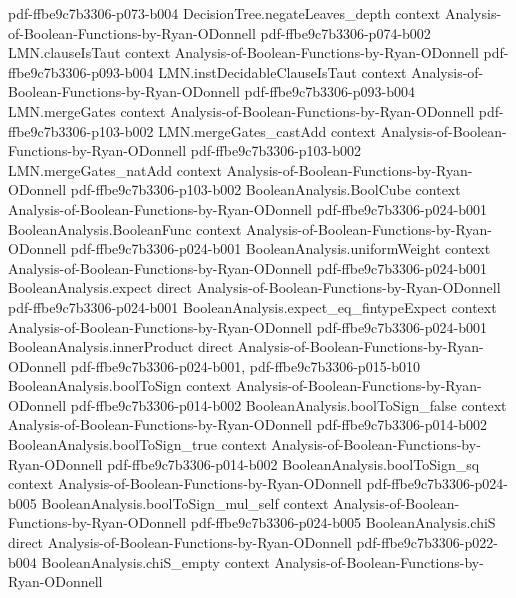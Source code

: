 \begin{theorem}
  {pdf-ffbe9c7b3306-p073-b004}
\proofstep
  {DecisionTree.negateLeaves_depth}
  {context}
  {Analysis-of-Boolean-Functions-by-Ryan-ODonnell}
  {pdf-ffbe9c7b3306-p074-b002}
\proofstep
  {LMN.clauseIsTaut}
  {context}
  {Analysis-of-Boolean-Functions-by-Ryan-ODonnell}
  {pdf-ffbe9c7b3306-p093-b004}
\proofstep
  {LMN.instDecidableClauseIsTaut}
  {context}
  {Analysis-of-Boolean-Functions-by-Ryan-ODonnell}
  {pdf-ffbe9c7b3306-p093-b004}
\proofstep
  {LMN.mergeGates}
  {context}
  {Analysis-of-Boolean-Functions-by-Ryan-ODonnell}
  {pdf-ffbe9c7b3306-p103-b002}
\proofstep
  {LMN.mergeGates_castAdd}
  {context}
  {Analysis-of-Boolean-Functions-by-Ryan-ODonnell}
  {pdf-ffbe9c7b3306-p103-b002}
\proofstep
  {LMN.mergeGates_natAdd}
  {context}
  {Analysis-of-Boolean-Functions-by-Ryan-ODonnell}
  {pdf-ffbe9c7b3306-p103-b002}
\proofstep
  {BooleanAnalysis.BoolCube}
  {context}
  {Analysis-of-Boolean-Functions-by-Ryan-ODonnell}
  {pdf-ffbe9c7b3306-p024-b001}
\proofstep
  {BooleanAnalysis.BooleanFunc}
  {context}
  {Analysis-of-Boolean-Functions-by-Ryan-ODonnell}
  {pdf-ffbe9c7b3306-p024-b001}
\proofstep
  {BooleanAnalysis.uniformWeight}
  {context}
  {Analysis-of-Boolean-Functions-by-Ryan-ODonnell}
  {pdf-ffbe9c7b3306-p024-b001}
\proofstep
  {BooleanAnalysis.expect}
  {direct}
  {Analysis-of-Boolean-Functions-by-Ryan-ODonnell}
  {pdf-ffbe9c7b3306-p024-b001}
\proofstep
  {BooleanAnalysis.expect_eq_fintypeExpect}
  {context}
  {Analysis-of-Boolean-Functions-by-Ryan-ODonnell}
  {pdf-ffbe9c7b3306-p024-b001}
\proofstep
  {BooleanAnalysis.innerProduct}
  {direct}
  {Analysis-of-Boolean-Functions-by-Ryan-ODonnell}
  {pdf-ffbe9c7b3306-p024-b001,
    pdf-ffbe9c7b3306-p015-b010}
\proofstep
  {BooleanAnalysis.boolToSign}
  {context}
  {Analysis-of-Boolean-Functions-by-Ryan-ODonnell}
  {pdf-ffbe9c7b3306-p014-b002}
\proofstep
  {BooleanAnalysis.boolToSign_false}
  {context}
  {Analysis-of-Boolean-Functions-by-Ryan-ODonnell}
  {pdf-ffbe9c7b3306-p014-b002}
\proofstep
  {BooleanAnalysis.boolToSign_true}
  {context}
  {Analysis-of-Boolean-Functions-by-Ryan-ODonnell}
  {pdf-ffbe9c7b3306-p014-b002}
\proofstep
  {BooleanAnalysis.boolToSign_sq}
  {context}
  {Analysis-of-Boolean-Functions-by-Ryan-ODonnell}
  {pdf-ffbe9c7b3306-p024-b005}
\proofstep
  {BooleanAnalysis.boolToSign_mul_self}
  {context}
  {Analysis-of-Boolean-Functions-by-Ryan-ODonnell}
  {pdf-ffbe9c7b3306-p024-b005}
\proofstep
  {BooleanAnalysis.chiS}
  {direct}
  {Analysis-of-Boolean-Functions-by-Ryan-ODonnell}
  {pdf-ffbe9c7b3306-p022-b004}
\proofstep
  {BooleanAnalysis.chiS_empty}
  {context}
  {Analysis-of-Boolean-Functions-by-Ryan-ODonnell}

\end{theorem}
